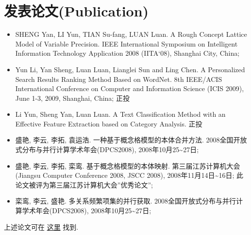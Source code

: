 \documentclass[a4paper,10pt,english]{manual}
\begin{document}
\section{发表论文(Publication)}
\begin{itemize}
\item {} 
SHENG Yan, LI Yun, TIAN Su-fang, LUAN Luan. A Rough Concept Lattice Model of Variable Precision. IEEE International Symposium on Intelligent Information Technology Application 2008 (IITA`08), Shanghai City, China;

\item {} 
Yun Li, Yan Sheng, Luan Luan, Lianglei Sun and Ling Chen. A Personalized Search Results Ranking Method Based on WordNet. 8th IEEE/ACIS International Conference on Computer and Information Science (ICIS 2009), June 1-3, 2009, Shanghai, China; 正投

\item {} 
Li Yun, Sheng Yan, Luan Luan. A Text Classification Method with an Effective Feature Extraction based on Category Analysis. 正投

\item {} 
盛艳, 李云, 李拓, 袁运浩. 一种基于概念格模型的本体合并方法. 2008全国开放式分布与并行计算学术年会(DPCS2008), 2008年10月25\textasciitilde{}27日;

\item {} 
盛艳, 李云, 李拓, 栾鸾. 基于概念格模型的本体映射. 第三届江苏计算机大会(Jiangsu Computer Conference 2008, JSCC 2008), 2008年11月14日\textasciitilde{}16日; 此论文被评为第三届江苏计算机大会''优秀论文'';

\item {} 
栾鸾, 李云, 盛艳. 多关系频繁项集的并行获取. 2008全国开放式分布与并行计算学术年会(DPCS2008), 2008年10月25\textasciitilde{}27日;

\end{itemize}

上述论文可在 \href{http://github.com/lizzie/lizworkspace/tree/cb82ad8d84a1b1a12df80e3508e3629abf09ac83/paper}{这里} 找到.
\end{document}
